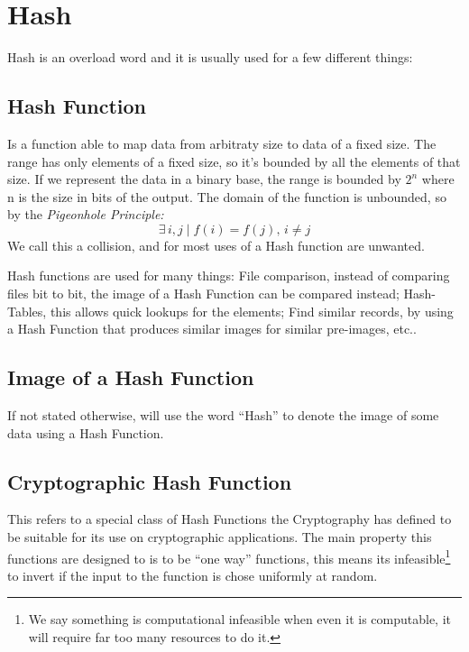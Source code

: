 \section{Hash}
Hash is an overload word and it is usually used for a few different things:

\subsection{Hash Function}
Is a function able to map data from arbitraty size to data of a fixed size.
The range has only elements of a fixed size, so it's bounded by all the
  elements of that size. If we represent the data in a binary base, the range
  is bounded by $2^n$ where n is the size in bits of the output.
The domain of the function is unbounded, so by the \textit{Pigeonhole
  Principle:}
\begin{equation}
	\exists \, i, j \mid f(i) = f(j), \, i \neq j
\end{equation}
We call this a collision, and for most uses of a Hash function are unwanted.

Hash functions are used for many things: File comparison, instead of comparing
  files bit to bit, the image of a Hash Function can be compared instead;
  Hash-Tables, this allows quick lookups for the elements; Find similar
  records, by using a Hash Function that produces similar images for similar
  pre-images, etc..

\subsection{Image of a Hash Function}

If not stated otherwise, will use the word ``Hash'' to denote the image of
  some data using a Hash Function.

\subsection{Cryptographic Hash Function}
This refers to a special class of Hash Functions the Cryptography has defined
  to be suitable for its use on cryptographic applications. The main property
  this functions are designed to is to be ``one way'' functions, this means
  its infeasible\footnote{We say something is computational infeasible when even
  it is computable, it will require far too many resources to do it.} to invert
  if the input to the function is chose uniformly at random.


